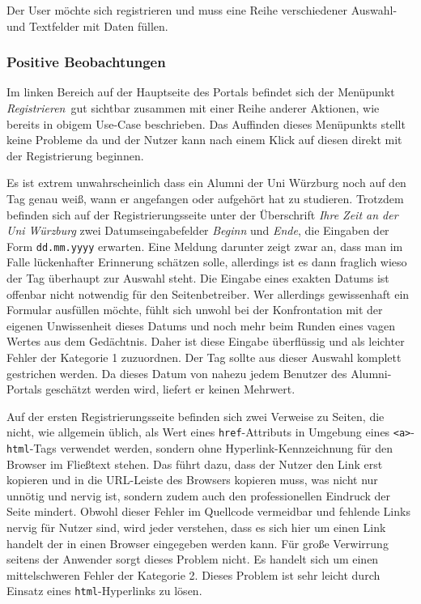 \newpage
{}\label{usecse:reg}
Der User möchte sich registrieren und muss eine Reihe verschiedener Auswahl- und Textfelder mit Daten füllen.

\subsubsection*{Positive Beobachtungen} 
Im linken Bereich auf der Hauptseite des Portals befindet sich der Menüpunkt \emph{ Registrieren}~gut sichtbar zusammen mit einer Reihe anderer Aktionen, wie bereits in obigem Use-Case beschrieben. Das Auffinden dieses Menüpunkts stellt keine Probleme da und der Nutzer kann nach einem Klick auf diesen direkt mit der Registrierung
beginnen.




{Es ist extrem unwahrscheinlich dass ein Alumni der Uni Würzburg noch auf den Tag genau weiß, wann er angefangen oder aufgehört hat zu studieren. Trotzdem befinden sich auf
der Registrierungsseite unter der Überschrift \emph{Ihre Zeit an der Uni Würzburg} zwei Datumseingabefelder \emph{Beginn} und \emph{Ende}, die Eingaben der Form \texttt{dd.mm.yyyy} erwarten.
}
{
Eine Meldung darunter zeigt zwar an, dass man im Falle lückenhafter Erinnerung schätzen solle, allerdings ist es dann fraglich wieso der Tag überhaupt zur Auswahl steht. Die Eingabe eines exakten Datums ist offenbar nicht notwendig für den Seitenbetreiber. Wer allerdings gewissenhaft ein Formular ausfüllen möchte, fühlt sich unwohl bei der Konfrontation mit der eigenen Unwissenheit dieses Datums und noch mehr beim Runden eines vagen Wertes aus dem Gedächtnis. Daher ist diese Eingabe überflüssig und als leichter Fehler der Kategorie 1 zuzuordnen.
}
{Der Tag sollte aus dieser Auswahl komplett gestrichen werden. Da dieses Datum von nahezu jedem Benutzer des Alumni-Portals geschätzt werden wird, liefert er keinen Mehrwert.
} 
\label{prob:reg:wtfday}

{Auf der ersten Registrierungsseite befinden sich zwei Verweise zu Seiten, die nicht, wie allgemein üblich, als Wert eines \texttt{href}-Attributs in Umgebung eines \texttt{\textless a\textgreater}-\texttt{html}-Tags verwendet werden, sondern ohne Hyperlink-Kennzeichnung für den Browser im Fließtext stehen. Das führt dazu, dass der Nutzer den Link erst kopieren und in die URL-Leiste des Browsers kopieren muss, was nicht nur unnötig und nervig ist, sondern zudem auch den professionellen Eindruck der Seite mindert.
}
{Obwohl dieser Fehler im Quellcode vermeidbar und fehlende Links nervig für Nutzer sind, wird jeder verstehen, dass es sich hier um einen Link handelt der in einen Browser eingegeben werden kann. Für große Verwirrung seitens der Anwender sorgt dieses Problem nicht. Es handelt sich um einen mittelschweren Fehler der Kategorie 2.
}
{Dieses Problem ist sehr leicht durch Einsatz eines \texttt{html}-Hy\-per\-links zu lösen.
} 
\label{prob:reg:hyperhyper}

